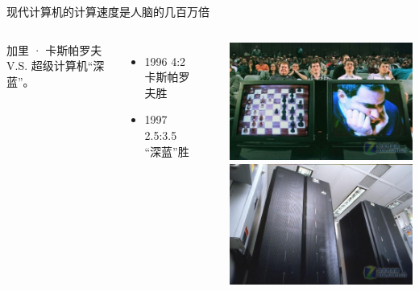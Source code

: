\documentclass[xcolor=svgnames]{beamer}
\begin{document}
\begin{frame}
  现代计算机的计算速度是人脑的几百万倍
  \begin{columns}
      加里 · 卡斯帕罗夫 \alert{V.S.} 超级计算机``深蓝''。
      \begin{itemize}
      \item 1996 4:2 卡斯帕罗夫胜
      \item 1997 2.5:3.5 ``深蓝''胜
      \end{itemize}

      \href{http://www.xqbase.com/computer/manvscomputer.htm}{}

        \centering
        \includegraphics[width=\textwidth]{fig17.jpg}\\
        \vspace{1em}
        \includegraphics[width=\textwidth]{fig18.jpg}
  \end{columns}
\end{frame}
\end{document}
